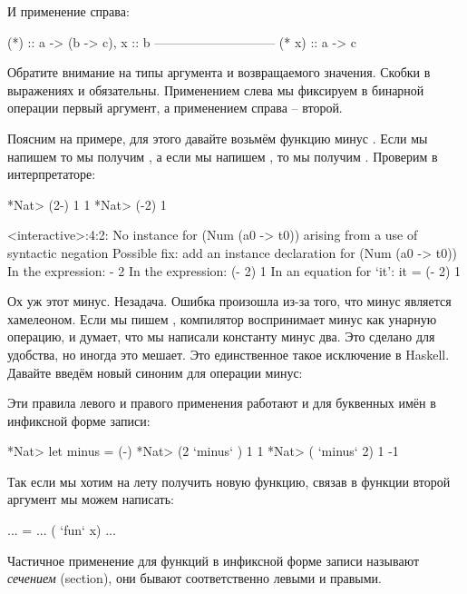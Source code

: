 И применение справа:


\begin{code}
                    (*) :: a -> (b -> c),   x :: b
                    -----------------------------
                            (* x) :: a -> c
\end{code}

Обратите внимание на типы аргумента и возвращаемого значения. Скобки в
выражениях  и  обязательны. Применением слева мы
фиксируем в бинарной операции первый аргумент, а применением справа --
второй.

Поясним на примере, для этого давайте возьмём функцию минус \In{(-)}.
Если мы напишем  то мы получим , а если мы напишем
, то мы получим . Проверим в интерпретаторе:


\begin{code}
*Nat> (2-) 1
1
*Nat> (-2) 1

<interactive>:4:2:
    No instance for (Num (a0 -> t0))
      arising from a use of syntactic negation
    Possible fix: add an instance declaration for (Num (a0 -> t0))
    In the expression: - 2
    In the expression: (- 2) 1
    In an equation for `it': it = (- 2) 1
\end{code}

Ох уж этот минус. Незадача. Ошибка произошла из-за того, что минус
является хамелеоном. Если мы пишем , компилятор воспринимает
минус как унарную операцию, и думает, что мы написали константу минус
два. Это сделано для удобства, но иногда это мешает. Это единственное
такое исключение в Haskell. Давайте введём новый синоним для операции
минус:



Эти правила левого и правого применения работают и для буквенных имён в
инфиксной форме записи:


\begin{code}
*Nat> let minus = (-)
*Nat> (2 `minus` ) 1
1
*Nat> ( `minus` 2) 1
-1
\end{code}

Так если мы хотим на лету получить новую функцию, связав в функции
второй аргумент мы можем написать:


\begin{code}
... = ... ( `fun` x) ...
\end{code}

Частичное применение для функций в инфиксной форме записи называют
\emph{сечением} (section), они бывают соответственно левыми и правыми.

